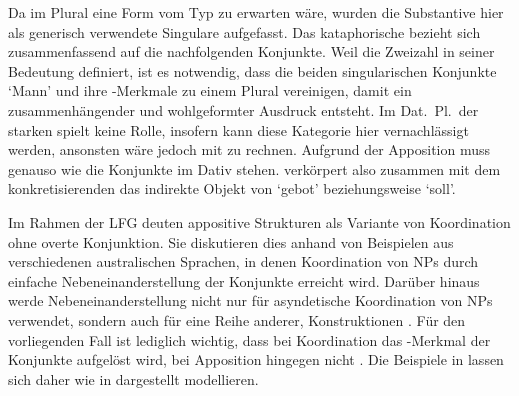 Da im Plural eine Form vom Typ  zu erwarten wäre, wurden die
Substantive hier als generisch verwendete
Singulare aufgefasst. Das kataphorische
 bezieht sich zusammenfassend auf die nachfolgenden Konjunkte. Weil
 die Zweizahl in seiner Bedeutung definiert, ist es notwendig, dass
die beiden singularischen Konjunkte  `Mann' und  ihre
-Merkmale zu einem Plural vereinigen, damit ein zusammenhängender
und wohlgeformter Ausdruck entsteht. Im Dat.~Pl.\ der starken
 spielt  keine Rolle, insofern kann diese
Kategorie hier vernachlässigt werden, ansonsten wäre jedoch mit  zu rechnen. Aufgrund der Apposition muss
 genauso wie die Konjunkte im Dativ stehen.  verkörpert
also zusammen mit dem konkretisierenden  das indirekte
Objekt von  `gebot' beziehungsweise  `soll'.

Im Rahmen der LFG deuten
\citet{sadlernordlinger2006} appositive Strukturen als Variante
von Koordination ohne overte Konjunktion. Sie diskutieren dies anhand von
Beispielen aus verschiedenen australischen Sprachen, in denen Koordination von
NPs durch einfache Nebeneinanderstellung der Konjunkte erreicht wird. Darüber
hinaus werde Nebeneinanderstellung nicht nur für asyndetische Koordination von
NPs verwendet, sondern auch für eine Reihe anderer, 
Konstruktionen \autocite[440--441]{sadlernordlinger2006}. Für
den vorliegenden Fall ist lediglich wichtig, dass bei Koordination das
-Merkmal der Konjunkte aufgelöst wird, bei Apposition
hingegen nicht \autocite[444]{sadlernordlinger2006}. Die Beispiele in
 lassen sich daher wie in
 dargestellt modellieren.

